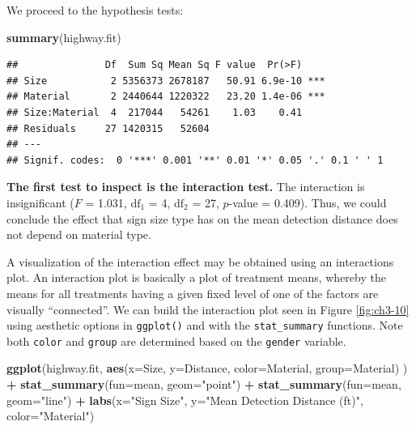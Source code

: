 \documentclass[
]{book}
\newenvironment{Shaded}{\begin{snugshade}}{\end{snugshade}}
\newcommand{\AttributeTok}[1]{\textcolor[rgb]{0.13,0.29,0.53}{#1}}
\newcommand{\FunctionTok}[1]{\textcolor[rgb]{0.13,0.29,0.53}{\textbf{#1}}}
\newcommand{\NormalTok}[1]{#1}
\newcommand{\SpecialCharTok}[1]{\textcolor[rgb]{0.81,0.36,0.00}{\textbf{#1}}}
\newcommand{\StringTok}[1]{\textcolor[rgb]{0.31,0.60,0.02}{#1}}
\begin{document}
We proceed to the hypothesis tests:

\begin{Shaded}
\begin{Highlighting}[]
\FunctionTok{summary}\NormalTok{(highway.fit)}
\end{Highlighting}
\end{Shaded}

\begin{verbatim}
##               Df  Sum Sq Mean Sq F value  Pr(>F)    
## Size           2 5356373 2678187   50.91 6.9e-10 ***
## Material       2 2440644 1220322   23.20 1.4e-06 ***
## Size:Material  4  217044   54261    1.03    0.41    
## Residuals     27 1420315   52604                    
## ---
## Signif. codes:  0 '***' 0.001 '**' 0.01 '*' 0.05 '.' 0.1 ' ' 1
\end{verbatim}

\textbf{The first test to inspect is the interaction test.} The interaction is insignificant (\(F\) = 1.031, \(\textrm{df}_1\) = 4, \(\textrm{df}_2\) = 27, \(p\)-value = 0.409). Thus, we could conclude the effect that sign size type has on the mean detection distance does not depend on material type.

A visualization of the interaction effect may be obtained using an interactions plot.
An interaction plot is basically a plot of treatment means, whereby the means for all treatments having a given fixed level of one of the factors are visually ``connected''.
We can build the interaction plot seen in Figure \ref{fig:ch3-10} using aesthetic options in \texttt{ggplot()} and with the \texttt{stat\_summary} functions.
Note both \texttt{color} and \texttt{group} are determined based on the \texttt{gender} variable.

\begin{Shaded}
\begin{Highlighting}[]
\FunctionTok{ggplot}\NormalTok{(highway.fit, }
       \FunctionTok{aes}\NormalTok{(}\AttributeTok{x=}\NormalTok{Size, }\AttributeTok{y=}\NormalTok{Distance, }\AttributeTok{color=}\NormalTok{Material, }\AttributeTok{group=}\NormalTok{Material) ) }\SpecialCharTok{+}  
  \FunctionTok{stat\_summary}\NormalTok{(}\AttributeTok{fun=}\NormalTok{mean, }\AttributeTok{geom=}\StringTok{"point"}\NormalTok{) }\SpecialCharTok{+} 
  \FunctionTok{stat\_summary}\NormalTok{(}\AttributeTok{fun=}\NormalTok{mean, }\AttributeTok{geom=}\StringTok{"line"}\NormalTok{) }\SpecialCharTok{+}
  \FunctionTok{labs}\NormalTok{(}\AttributeTok{x=}\StringTok{"Sign Size"}\NormalTok{, }\AttributeTok{y=}\StringTok{"Mean Detection Distance (ft)"}\NormalTok{, }\AttributeTok{color=}\StringTok{"Material"}\NormalTok{)}
\end{Highlighting}
\end{Shaded}
\end{document}
